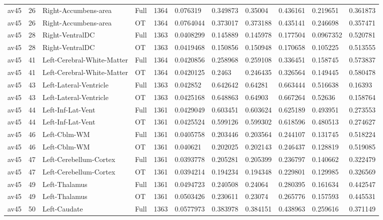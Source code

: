 \begin{landscape}
\begin{longtable}{lllllllllll}
av45 & 26 & Right-Accumbens-area & Full & 1364 & 0.076319 & 0.349873 & 0.35004 & 0.436161 & 0.219651 & 0.361873 \\
av45 & 26 & Right-Accumbens-area & OT & 1364 & 0.0764044 & 0.373017 & 0.373188 & 0.435141 & 0.246698 & 0.357471 \\
av45 & 28 & Right-VentralDC & Full & 1363 & 0.0408299 & 0.145889 & 0.145978 & 0.177504 & 0.0967352 & 0.520781 \\
av45 & 28 & Right-VentralDC & OT & 1363 & 0.0419468 & 0.150856 & 0.150948 & 0.170658 & 0.105225 & 0.513555 \\
av45 & 41 & Left-Cerebral-White-Matter & Full & 1364 & 0.0420856 & 0.258968 & 0.259108 & 0.336451 & 0.158745 & 0.573837 \\
av45 & 41 & Left-Cerebral-White-Matter & OT & 1364 & 0.0420125 & 0.2463 & 0.246435 & 0.326564 & 0.149445 & 0.580478 \\
av45 & 43 & Left-Lateral-Ventricle & Full & 1363 & 0.042852 & 0.642642 & 0.64281 & 0.663444 & 0.516638 & 0.16393 \\
av45 & 43 & Left-Lateral-Ventricle & OT & 1363 & 0.0425168 & 0.648863 & 0.64903 & 0.667264 & 0.52636 & 0.158764 \\
av45 & 44 & Left-Inf-Lat-Vent & Full & 1361 & 0.0429049 & 0.603451 & 0.603624 & 0.625189 & 0.493951 & 0.273553 \\
av45 & 44 & Left-Inf-Lat-Vent & OT & 1361 & 0.0425524 & 0.599126 & 0.599302 & 0.618596 & 0.480513 & 0.274627 \\
av45 & 46 & Left-Cblm-WM & Full & 1361 & 0.0405758 & 0.203446 & 0.203564 & 0.244107 & 0.131745 & 0.518224 \\
av45 & 46 & Left-Cblm-WM & OT & 1361 & 0.040621 & 0.202025 & 0.202143 & 0.246437 & 0.128819 & 0.519085 \\
av45 & 47 & Left-Cerebellum-Cortex & Full & 1361 & 0.0393778 & 0.205281 & 0.205399 & 0.236797 & 0.140662 & 0.322479 \\
av45 & 47 & Left-Cerebellum-Cortex & OT & 1361 & 0.0394214 & 0.194234 & 0.194348 & 0.229801 & 0.129985 & 0.326569 \\
av45 & 49 & Left-Thalamus & Full & 1361 & 0.0494723 & 0.240508 & 0.24064 & 0.280395 & 0.161634 & 0.442547 \\
av45 & 49 & Left-Thalamus & OT & 1361 & 0.0503426 & 0.230611 & 0.23074 & 0.265776 & 0.157593 & 0.445531 \\
av45 & 50 & Left-Caudate & Full & 1363 & 0.0577973 & 0.383978 & 0.384151 & 0.438963 & 0.259616 & 0.371149 \\

\end{longtable}
\end{landscape}
